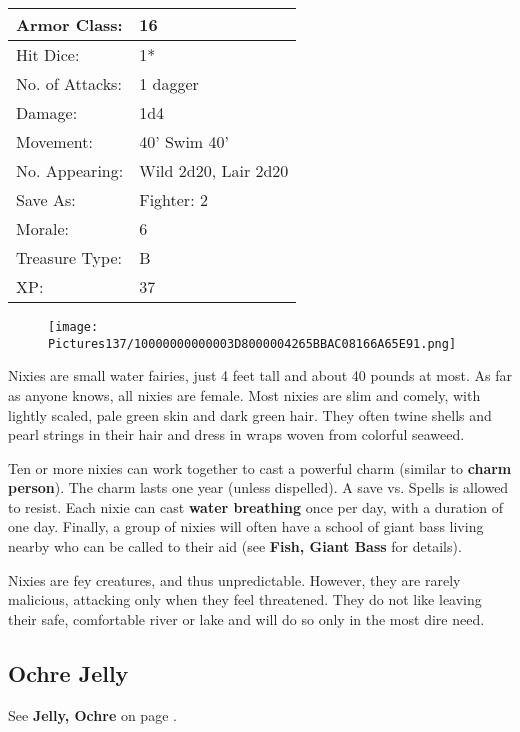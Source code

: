 \documentclass[a4paper,twoside,openany,10pt]{book}
\begin{document}
\begin{multicols}{2}
\begin{tabularx}{0.50\textwidth}{@{}lX@{}}
Armor Class: & 16 \\\hline
Hit Dice: & 1* \\\hline
No. of Attacks: & 1 dagger \\\hline
Damage: & 1d4 \\\hline
Movement: & 40' Swim 40' \\\hline
No. Appearing: & Wild 2d20, Lair 2d20 \\\hline
Save As: & Fighter: 2 \\\hline
Morale: & 6 \\\hline
Treasure Type: & B \\\hline
XP: & 37 \\\hline
\end{tabularx}\medskip

\begin{wrapfigure}{l}{0.25\textwidth}
	\texttt{[image: Pictures137/10000000000003D8000004265BBAC08166A65E91.png]}
\end{wrapfigure}

Nixies are small water fairies, just 4 feet tall and about 40 pounds at most. As far as anyone knows, all nixies are female. Most nixies are slim and comely, with lightly scaled, pale green skin and dark green hair. They often twine shells and pearl strings in their hair and dress in wraps woven from colorful seaweed.

Ten or more nixies can work together to cast a powerful charm (similar to \textbf{charm person}). The charm lasts one year (unless dispelled). A save vs. Spells is allowed to resist. Each nixie can cast \textbf{water breathing }once per day, with a duration of one day. Finally, a group of nixies will often have a school of giant bass living nearby who can be called to their aid (see \textbf{Fish, Giant Bass} for details).

Nixies are fey creatures, and thus unpredictable. However, they are rarely malicious, attacking only when they feel threatened. They do not like leaving their safe, comfortable river or lake and will do so only in the most dire need.

\subsection*{Ochre Jelly}\label{ochre-jelly}

See \textbf{Jelly, Ochre }on page
\hyperlink{jelly-ochre}{\pageref{jelly-ochre}}.


\end{multicols}
\end{document}
